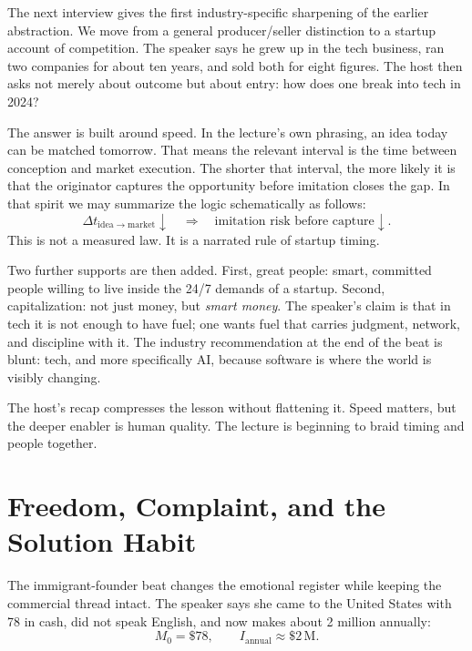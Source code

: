 The next interview gives the first industry-specific sharpening of the earlier abstraction. We move from a general producer/seller distinction to a startup account of competition. The speaker says he grew up in the tech business, ran two companies for about ten years, and sold both for eight figures. The host then asks not merely about outcome but about entry: how does one break into tech in 2024?

The answer is built around speed. In the lecture's own phrasing, an idea today can be matched tomorrow. That means the relevant interval is the time between conception and market execution. The shorter that interval, the more likely it is that the originator captures the opportunity before imitation closes the gap. In that spirit we may summarize the logic schematically as follows:
\begin{equation}
\Delta t_{\mathrm{idea}\to\mathrm{market}} \downarrow
\quad \Longrightarrow \quad
\text{imitation risk before capture} \downarrow .
\end{equation}
This is not a measured law. It is a narrated rule of startup timing.

Two further supports are then added. First, great people: smart, committed people willing to live inside the 24/7 demands of a startup. Second, capitalization: not just money, but \emph{smart money}. The speaker's claim is that in tech it is not enough to have fuel; one wants fuel that carries judgment, network, and discipline with it. The industry recommendation at the end of the beat is blunt: tech, and more specifically AI, because software is where the world is visibly changing.

The host's recap compresses the lesson without flattening it. Speed matters, but the deeper enabler is human quality. The lecture is beginning to braid timing and people together.

\section{Freedom, Complaint, and the Solution Habit}

The immigrant-founder beat changes the emotional register while keeping the commercial thread intact. The speaker says she came to the United States with \text{\$}78 in cash, did not speak English, and now makes about \text{\$}2 million annually:
\begin{equation}
M_0 = \text{\$}78,
\qquad
I_{\mathrm{annual}} \approx \text{\$}2\,\mathrm{M}.
\end{equation}

